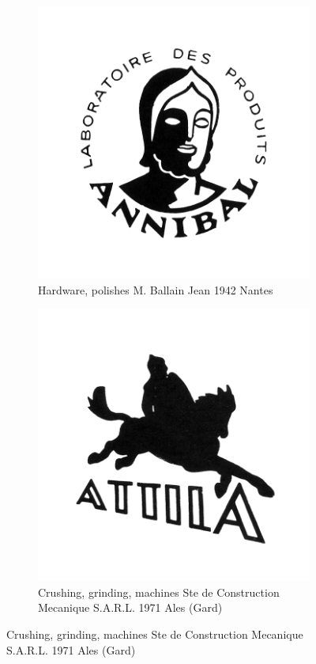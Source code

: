 \begin{figure}[h]
  \begin{subfigure}{.45\textwidth}
    \centering
    \includegraphics[width=.5\linewidth]{images/supplement/trademarks/french/6_3}
    \caption[]{Hardware, polishes M. Ballain Jean 1942 Nantes}
    \label{fig:trademarks:french:6.3}
  \end{subfigure}
  \begin{subfigure}{.45\textwidth}
    \centering
    \includegraphics[width=.5\linewidth]{images/supplement/trademarks/french/6_4}
    \caption[]{Crushing, grinding, machines Ste de Construction Mecanique S.A.R.L. 1971 Ales (Gard)}
    \label{fig:trademarks:french:6.4}
  \end{subfigure}


\end{figure}
